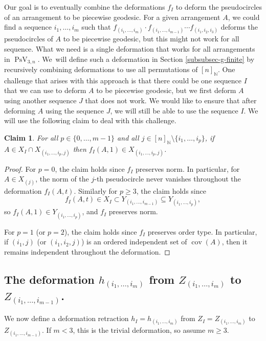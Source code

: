\documentclass[JEP,XML,SOM,Unicode,NoFloatCountersInSection,published]{cedram}
\newtheorem{claim}[theorem]{Claim}
\theoremstyle{remark}
\let\mb\mathbb
\DeclareMathOperator{\pstief}{PsV}
\DeclareMathOperator{\cov}{cov}
\begin{document}
Our goal is to eventually combine the deformations $f_I$ to deform the pseudocircles of an arrangement to be piecewise geodesic. For a given arrangement $A$, we could find a sequence $i_1,\dots,i_m$ such that $f_{(i_1,\dots,i_m)}\cdot f_{(i_1,\dots,i_{m-1})}\cdots f_{(i_1,i_2,i_3)}$ deforms the pseudocircles of $A$ to be piecewise geodesic, but this might not work for all sequence.
What we need is a single deformation that works for all arrangements in $\pstief_{3,n}$. We~will define such a deformation in Section \ref{subsubsec-g-finite} by recursively combining deformations to use all permutations of $[n]_\mb{N}$. One challenge that arises with this approach is that there could be one sequence $I$ that we can use to deform $A$ to be piecewise geodesic, but we first deform $A$ using another sequence $J$ that does not work. We would like to ensure that after deforming $A$ using the sequence $J$, we will still be able to use the sequence $I$. We will use the following claim to deal with this challenge.

\begin{claim}\label{claim-stable-f}
For all $p \in \{0,\dots,m{-}1\}$ and all $j \in [n]_\mb{N} \setminus \{i_1,\dots,i_p\}$,
if $A \in X_I \cap X_{(i_1,\dots,i_{p},j)}$ then $f_I(A,1) \in X_{(i_1,\dots,i_{p},j)}$.
\end{claim}

\begin{proof}
For $p=0$, the claim holds since $f_I$ preserves norm. In particular, for \hbox{$A \in X_{(j)}$}, the norm of the $j$-th pseudocircle never vanishes throughout the deformation $f_I(A,t)$.
Similarly for $p\geq 3$, the claim holds since
\[
f_I(A,t) \in X_I \subset Y_{(i_1,\dots,i_{m-1})} \subseteq Y_{(i_1,\dots,i_p)},
\]
so $f_I(A,1) \in Y_{(i_1,\dots,i_p)}$, and $f_I$ preserves norm.

For $p=1$ (or $p=2$), the claim holds since $f_I$ preserves order type. In particular, if $(i_1,j)$ (or $(i_1,i_2,j)$) is an ordered independent set of $\cov(A)$, then it remains independent throughout the deformation.
\end{proof}

\subsection{The deformation $h_{(i_1,\dots,i_m)}$ from $Z_{(i_1,\dots,i_m)}$ to $Z_{(i_1,\dots,i_{m-1})}$.}
\label{subsubsec-h}

We now define a deformation retraction $h_I = h_{(i_1,\dots,i_m)}$ from $Z_I = Z_{(i_1,\dots,i_m)}$ to $Z_{(i_1,\dots,i_{m-1})}$. If $m < 3$, this is the trivial deformation, so assume $m \geq 3$.
\end{document}
